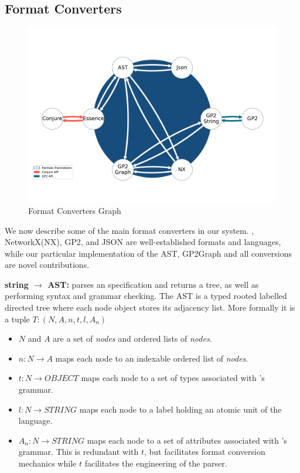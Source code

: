 \documentclass[runningheads]{llncs}
\begin{document}
\subsection{Format Converters}

\vspace{-25pt}
\begin{figure}[ht]
\centering
  \includegraphics[width=0.85\columnwidth]{ICGT2024mapedit.pdf}
  \caption{Format Converters Graph}
    \label{fig:FormatConverts}
\end{figure}

We now describe some of the main format converters in our system. \essence, NetworkX(NX), GP2, and JSON are well-established formats and languages, while our particular implementation of the AST, GP2Graph and all conversions are novel contributions.


\textbf{\essence string $\rightarrow$ \essence AST:} parses an \essence specification and returns a tree, as well as performing syntax and grammar checking. The AST is a typed rooted labelled directed tree where each node object stores its adjacency list. More formally it is a tuple $T : (N, A, n, t, l, A_n)$
\begin{itemize}
    \item $N$ and $A$ are a set of \textit{nodes} and ordered lists of \textit{nodes}.
    \item $n : N \rightarrow A$ maps each node to an indexable ordered list of \textit{nodes}.
    \item $t : N \rightarrow OBJECT$ maps each node to a set of types associated with \essence's grammar.
    \item $l : N \rightarrow STRING$ maps each node to a label holding an atomic unit of the \essence language.
    \item $A_n : N \rightarrow STRING$ maps each node to a set of attributes associated with \essence's grammar. This is redundant with $t$, but facilitates format conversion mechanics while $t$ facilitates the engineering of the parser.
\end{itemize}
\end{document}
